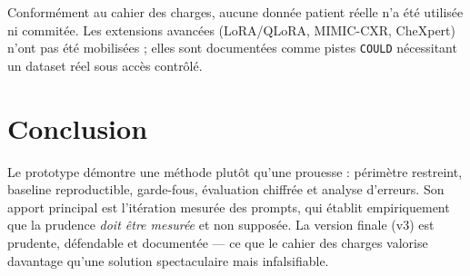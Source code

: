 \documentclass[11pt,a4paper]{article}
\begin{document}
\vspace{0.4cm}
\noindent Conformément au cahier des charges, aucune donnée patient réelle n'a été utilisée ni
commitée. Les extensions avancées (LoRA/QLoRA, MIMIC-CXR, CheXpert) n'ont pas été mobilisées ;
elles sont documentées comme pistes \texttt{COULD} nécessitant un dataset réel sous accès contrôlé.

\section{Conclusion}
Le prototype démontre une méthode plutôt qu'une prouesse : périmètre restreint, baseline
reproductible, garde-fous, évaluation chiffrée et analyse d'erreurs. Son apport principal est
l'itération mesurée des prompts, qui établit empiriquement que la prudence \emph{doit être
mesurée} et non supposée. La version finale (v3) est prudente, défendable et documentée --- ce que
le cahier des charges valorise davantage qu'une solution spectaculaire mais infalsifiable.
\end{document}
